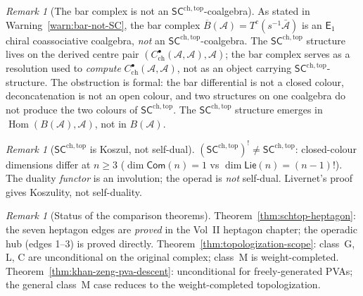 \documentclass[11pt,reqno]{amsart}
\theoremstyle{definition}
\theoremstyle{remark}
\newtheorem{remark}[theorem]{Remark}
\newcommand{\cA}{\mathcal{A}}
\newcommand{\barB}{\overline{B}}
\newcommand{\barA}{\bar{\cA}}
\newcommand{\Eone}{\mathsf{E}_{1}}
\newcommand{\SCchtop}{\mathsf{SC}^{\mathrm{ch,top}}}
\newcommand{\Com}{\mathsf{Com}}
\newcommand{\Lie}{\mathsf{Lie}}
\DeclareMathOperator{\Hom}{Hom}
\numberwithin{equation}{section}
\begin{document}
\begin{remark}[The bar complex is not an $\SCchtop$-coalgebra]
\label{rem:bar-not-schtop-coalgebra}
As stated in Warning~\ref{warn:bar-not-SC}, the bar complex
$\barB(\cA) = T^c(s^{-1}\barA)$ is an $\Eone$ chiral
coassociative coalgebra, \emph{not} an $\SCchtop$-coalgebra. The
$\SCchtop$ structure lives on the derived centre pair
$(C^\bullet_{\mathrm{ch}}(\cA,\cA), \cA)$; the bar complex serves
as a resolution used to \emph{compute}
$C^\bullet_{\mathrm{ch}}(\cA,\cA)$, not as an object carrying
$\SCchtop$-structure. The obstruction is formal: the bar
differential is not a closed colour, deconcatenation is not an open
colour, and two structures on one coalgebra do not produce the two
colours of $\SCchtop$. The $\SCchtop$ structure emerges in
$\Hom(B(\cA),\cA)$, not in $B(\cA)$.
\end{remark}

\begin{remark}[$\SCchtop$ is Koszul, not self-dual]
\label{rem:schtop-not-selfdual}
$(\SCchtop)^! \ne \SCchtop$: closed-colour dimensions differ
at $n \ge 3$ ($\dim\Com(n) = 1$ vs $\dim\Lie(n) = (n-1)!$).
The duality \emph{functor} is an involution; the operad
is \emph{not} self-dual. Livernet's proof gives Koszulity, not
self-duality.
\end{remark}

\begin{remark}[Status of the comparison theorems]
\label{rem:schtop-epistemic}
Theorem~\ref{thm:schtop-heptagon}: the seven heptagon edges are
\emph{proved} in the Vol~II heptagon chapter; the
operadic hub (edges 1--3) is proved directly.
Theorem~\ref{thm:topologization-scope}: class~G, L, C
are unconditional on the original complex; class~M is
weight-completed. Theorem~\ref{thm:khan-zeng-pva-descent}:
unconditional for freely-generated PVAs; the general class~M case
reduces to the weight-completed topologization.
\end{remark}


\end{document}
